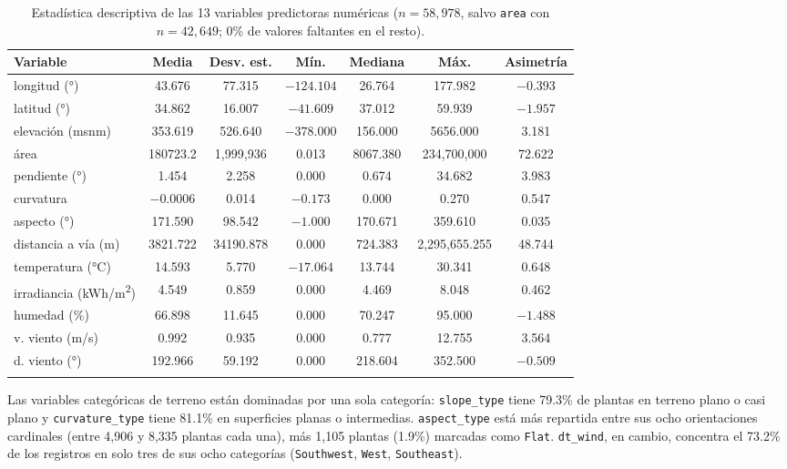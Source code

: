 \documentclass[pdflatex,sn-mathphys-num]{sn-jnl}
\begin{document}
\begin{table}[h]
\caption{Estadística descriptiva de las 13 variables predictoras numéricas ($n=58{,}978$, salvo \texttt{area} con $n=42{,}649$; 0\% de valores faltantes en el resto).}\label{tab:descriptivas}
\begin{tabular}{@{}lcccccc@{}}
\toprule
Variable & Media & Desv. est. & Mín. & Mediana & Máx. & Asimetría \\
\midrule
longitud (°)          & 43.676   & 77.315   & $-124.104$ & 26.764  & 177.982       & $-0.393$ \\
latitud (°)           & 34.862   & 16.007   & $-41.609$  & 37.012  & 59.939        & $-1.957$ \\
elevación (msnm)      & 353.619  & 526.640  & $-378.000$ & 156.000 & 5656.000      & 3.181 \\
área                  & 180723.2 & 1{,}999{,}936 & 0.013 & 8067.380 & 234{,}700{,}000 & 72.622 \\
pendiente (°)         & 1.454    & 2.258    & 0.000      & 0.674   & 34.682        & 3.983 \\
curvatura             & $-0.0006$& 0.014    & $-0.173$   & 0.000   & 0.270         & 0.547 \\
aspecto (°)           & 171.590  & 98.542   & $-1.000$   & 170.671 & 359.610       & 0.035 \\
distancia a vía (m)   & 3821.722 & 34190.878& 0.000      & 724.383 & 2{,}295{,}655.255 & 48.744 \\
temperatura (°C)      & 14.593   & 5.770    & $-17.064$  & 13.744  & 30.341        & 0.648 \\
irradiancia (kWh/m\textsuperscript{2}) & 4.549 & 0.859 & 0.000 & 4.469 & 8.048 & 0.462 \\
humedad (\%)          & 66.898   & 11.645   & 0.000      & 70.247  & 95.000        & $-1.488$ \\
v. viento (m/s)       & 0.992    & 0.935    & 0.000      & 0.777   & 12.755        & 3.564 \\
d. viento (°)         & 192.966  & 59.192   & 0.000      & 218.604 & 352.500       & $-0.509$ \\
\botrule
\end{tabular}
\end{table}

Las variables categóricas de terreno están dominadas por una sola categoría: \texttt{slope\_type} tiene 79.3\% de plantas en terreno plano o casi plano y \texttt{curvature\_type} tiene 81.1\% en superficies planas o intermedias. \texttt{aspect\_type} está más repartida entre sus ocho orientaciones cardinales (entre 4{,}906 y 8{,}335 plantas cada una), más 1{,}105 plantas (1.9\%) marcadas como \texttt{Flat}. \texttt{dt\_wind}, en cambio, concentra el 73.2\% de los registros en solo tres de sus ocho categorías (\texttt{Southwest}, \texttt{West}, \texttt{Southeast}).
\end{document}
